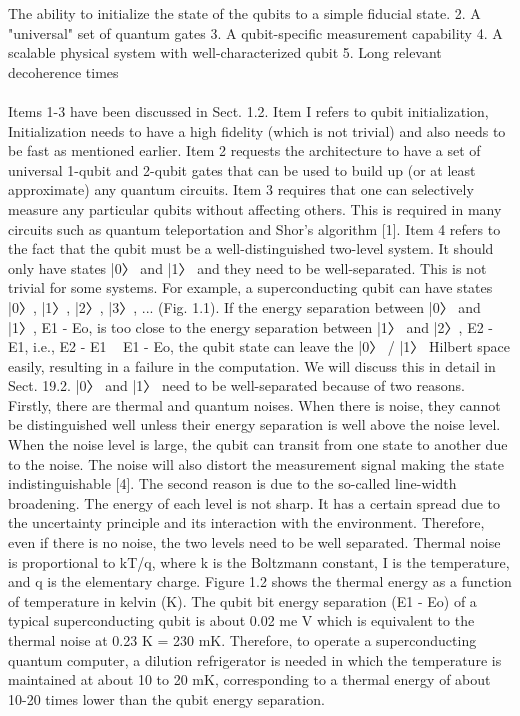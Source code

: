 \documentclass{article}
\begin{document}
The ability to initialize the state of the qubits to a simple fiducial state.
2. A "universal" set of quantum gates
3. A qubit-specific measurement capability
4. A scalable physical system with well-characterized qubit
5. Long relevant decoherence times
\\\\
Items 1-3 have been discussed in Sect. 1.2. Item I refers to qubit initialization, Initialization needs to have a high fidelity (which is not trivial) and also needs to be fast as mentioned earlier. Item 2 requests the architecture to have a set of universal
1-qubit and 2-qubit gates that can be used to build up (or at least approximate) any quantum circuits. Item 3 requires that one can selectively measure any particular qubits without affecting others. This is required in many circuits such as quantum teleportation and Shor's algorithm [1].
Item 4 refers to the fact that the qubit must be a well-distinguished two-level system. It should only have states |0〉 and |1〉 and they need to be well-separated.
This is not trivial for some systems. For example, a superconducting qubit can have states |0〉, |1〉, |2〉, |3〉, ... (Fig. 1.1). If the energy separation between |0〉 and |1〉, E1 - Eo, is too close to the energy separation between  |1〉 and  |2〉, E2 - E1, i.e., E2 - E1 ~ E1 - Eo, the qubit state can leave the |0〉 / |1〉 Hilbert space easily, resulting in a failure in the computation. We will discuss this in detail in Sect. 19.2.
|0〉 and |1〉 need to be well-separated because of two reasons. Firstly, there are thermal and quantum noises. When there is noise, they cannot be distinguished well unless their energy separation is well above the noise level. When the noise level is large, the qubit can transit from one state to another due to the noise. The noise will also distort the measurement signal making the state indistinguishable [4]. The second reason is due to the so-called line-width broadening. The energy of each level is not sharp. It has a certain spread due to the uncertainty principle and its interaction with the environment. Therefore, even if there is no noise, the two levels need to be well separated.
Thermal noise is proportional to kT/q, where k is the Boltzmann constant, I is the temperature, and q is the elementary charge. Figure 1.2 shows the thermal energy as a function of temperature in kelvin (K). The qubit bit energy separation (E1 - Eo) of a typical superconducting qubit is about 0.02 me V which is equivalent
to the thermal noise at 0.23 K = 230 mK. Therefore, to operate a superconducting
quantum computer, a dilution refrigerator is needed in which the temperature is maintained at about 10 to 20 mK, corresponding to a thermal energy of about 10-20 times lower than the qubit energy separation.
\end{document}
